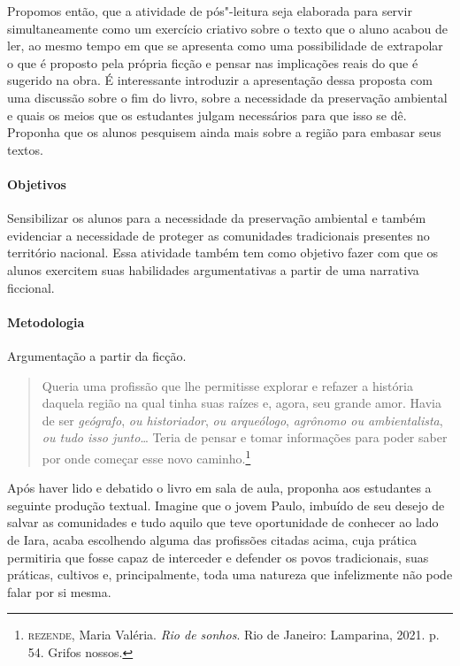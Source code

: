 \documentclass[12pt]{extarticle}
\begin{document}
Propomos então, que a atividade de pós"-leitura seja elaborada para servir simultaneamente como
um exercício criativo sobre o texto que o aluno
acabou de ler, ao mesmo tempo em que se apresenta como uma
possibilidade de extrapolar o que é proposto pela própria ficção e
pensar nas implicações reais do que é sugerido na obra. É interessante
introduzir a apresentação dessa proposta com uma discussão sobre o fim
do livro, sobre a necessidade da preservação ambiental e quais os
meios que os estudantes julgam necessários para que isso se dê.
Proponha que os alunos pesquisem ainda mais sobre a região para
embasar seus textos.

\paragraph{Objetivos}
Sensibilizar os alunos para a necessidade da preservação ambiental e
também evidenciar a necessidade de proteger as comunidades
tradicionais presentes no território nacional. Essa atividade também
tem como objetivo fazer com que os alunos exercitem suas habilidades
argumentativas a partir de uma narrativa ficcional.

\paragraph{Metodologia}
Argumentação a partir da ficção.

\begin{quote}
Queria uma profissão que lhe permitisse explorar e refazer a história
daquela região na qual tinha suas raízes e, agora, seu grande amor.
Havia de ser \emph{geógrafo}, \emph{ou historiador}, \emph{ou
arqueólogo}, \emph{agrônomo ou ambientalista}, \emph{ou tudo isso
junto}\ldots{} Teria de pensar e tomar informações para poder saber
por onde começar esse novo caminho.\footnote{\textsc{rezende}, Maria Valéria. \emph{Rio de sonhos}. Rio de Janeiro: Lamparina, 2021. p.\,54. Grifos nossos.}
\end{quote}

Após haver lido e debatido o livro em sala de aula, proponha aos
estudantes a seguinte produção textual. Imagine que o jovem Paulo,
imbuído de seu desejo de salvar as comunidades e tudo aquilo que teve
oportunidade de conhecer ao lado de Iara, acaba escolhendo alguma das
profissões citadas acima, cuja prática permitiria que fosse capaz de
interceder e defender os povos tradicionais, suas práticas, cultivos
e, principalmente, toda uma natureza que infelizmente não pode falar
por si mesma.
\end{document}
